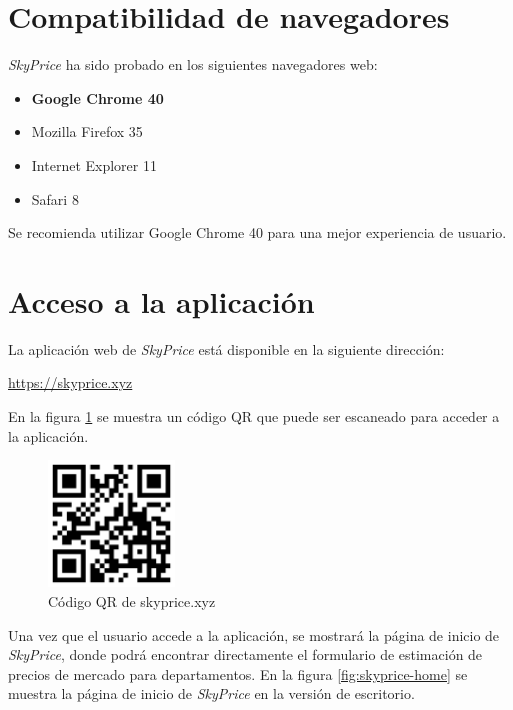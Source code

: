\section{Compatibilidad de navegadores}

\textit{SkyPrice} ha sido probado en los siguientes navegadores web:

\begin{itemize}
\item \textbf{Google Chrome 40}
\item Mozilla Firefox 35
\item Internet Explorer 11
\item Safari 8
\end{itemize}

Se recomienda utilizar Google Chrome 40 para una mejor experiencia de usuario.

\section{Acceso a la aplicación}
La aplicación web de \textit{SkyPrice} está disponible en la siguiente dirección:

\begin{center}
\url{https://skyprice.xyz}
\end{center}

En la figura \ref{fig:skyprice-xyz-qr} se muestra un código QR que puede ser escaneado
para acceder a la aplicación.

\begin{figure}[H]
  \centering
  \includegraphics[width=0.3\textwidth]{imagenes/02-requerimientos/skyprice-xyz-qr.png}
  \caption{Código QR de skyprice.xyz}
  \label{fig:skyprice-xyz-qr}
\end{figure}

Una vez que el usuario accede a la aplicación, se mostrará la página de inicio de \textit{SkyPrice},
donde podrá encontrar directamente el formulario de estimación de precios de mercado para departamentos.
En la figura \ref{fig:skyprice-home} se muestra la página de inicio de \textit{SkyPrice}
en la versión de escritorio.

